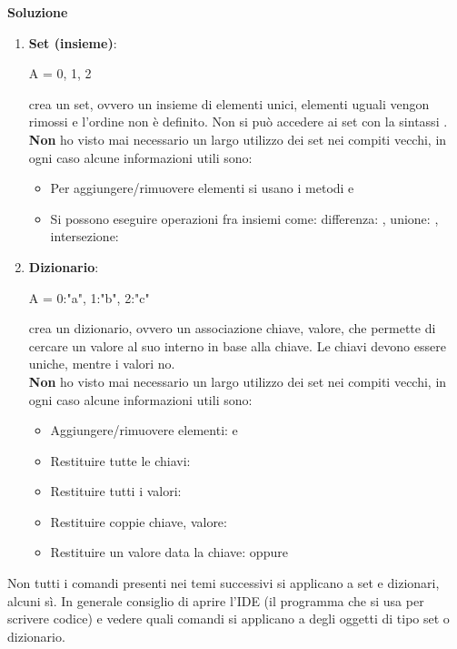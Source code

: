 \documentclass[10pt]{article}
\makeatletter
\newcommand{\<}{\langle}
\renewcommand{\>}{\rangle}
\renewenvironment{proof}[1][\proofname] {\par\pushQED{\qed}
\renewcommand*{\proofname}{Soluzione}
{\normalfont\sffamily\bfseries\topsep6\p@\@plus6\p@\relax #1\@addpunct{.} }}{\popQED\endtrivlist\@endpefalse}
\theoremstyle{mystyle}{\newtheorem*{remark}{Nota}}
\theoremstyle{mystyle}{\newtheorem*{remarks}{Note}}
\theoremstyle{mystyle}{\newtheorem*{example}{Esempio}}
\theoremstyle{mystyle}{\newtheorem*{examples}{Esempi}}
\theoremstyle{definition}{\newtheorem*{exercise}{Exercise}}
\theoremstyle{warn}
\makeatother
\begin{document}
\begin{proof}
\begin{enumerate}
    \item \textbf{Set (insieme)}:
    \begin{python}
A = {0, 1, 2}
    \end{python}
    crea un set, ovvero un insieme di elementi unici, elementi uguali vengon rimossi e l'ordine non è definito. Non si può accedere ai set con la sintassi .\\
    \textbf{Non} ho visto mai necessario un largo utilizzo dei set nei compiti vecchi, in ogni caso alcune informazioni utili sono:
    \begin{itemize}
        \item Per aggiungere/rimuovere elementi si usano i metodi  e 
        \item Si possono eseguire operazioni fra insiemi come: differenza: , unione: , intersezione: 
    \end{itemize}
    \item \textbf{Dizionario}:
    \begin{python}
A = {0:"a", 1:"b", 2:"c"}
    \end{python}
    crea un dizionario, ovvero un associazione chiave, valore, che permette di cercare un valore al suo interno in base alla chiave. Le chiavi devono essere uniche, mentre i valori no.\\
    \textbf{Non} ho visto mai necessario un largo utilizzo dei set nei compiti vecchi, in ogni caso alcune informazioni utili sono:
    \begin{itemize}
    \item Aggiungere/rimuovere elementi:  e 
    \item Restituire tutte le chiavi: 
    \item Restituire tutti i valori: 
    \item Restituire coppie chiave, valore: 
    \item Restituire un valore data la chiave:  oppure 
    \end{itemize}
\end{enumerate}
\end{proof}
\begin{remark}
Non tutti i comandi presenti nei temi successivi si applicano a set e dizionari, alcuni sì. In generale consiglio di aprire l'IDE (il programma che si usa per scrivere codice) e vedere quali comandi si applicano a degli oggetti di tipo set o dizionario.
\end{remark}
\end{document}
